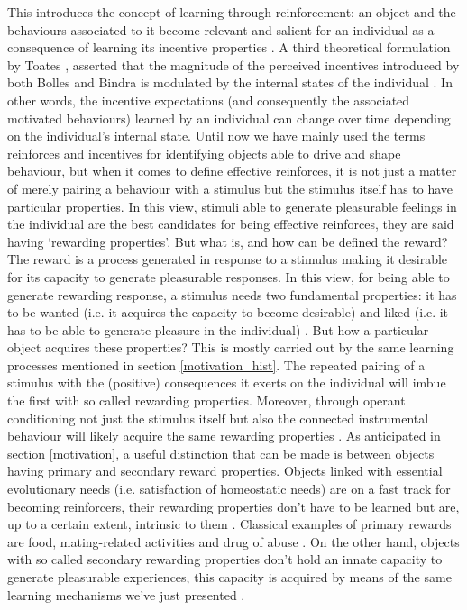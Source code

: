 This introduces the concept of learning through reinforcement: an object and the behaviours associated to it become relevant and salient for an individual as a consequence of learning its incentive properties \cite{berridge2004motivation}. A third theoretical formulation by Toates \cite{toates1994comparing}, asserted that the magnitude of the perceived incentives introduced by both Bolles and Bindra is modulated by the internal states of the individual \cite{toates1994comparing,berridge2004motivation}. In other words, the incentive expectations (and consequently the associated motivated behaviours) learned by an individual can change over time depending on the individual's internal state. Until now we have mainly used the terms reinforces and incentives for identifying objects able to drive and shape behaviour, but when it comes to define effective reinforces, it is not just a matter of merely pairing a behaviour with a stimulus but the stimulus itself has to have particular properties. In this view, stimuli able to generate pleasurable feelings in the individual are the best candidates for being effective reinforces, they are said having ‘rewarding properties’. But what is, and how can be defined the reward? The reward is a process generated in response to a stimulus making it desirable for its capacity to generate pleasurable responses. In this view, for being able to generate rewarding response, a stimulus needs two fundamental properties: it has to be wanted (i.e. it acquires the capacity to become desirable) and liked (i.e. it has to be able to generate pleasure in the individual) \cite{berridge2009dissecting}. But how a particular object acquires these properties? This is mostly carried out by the same learning processes mentioned in section \ref{motivation_hist}. The repeated pairing of a stimulus with the (positive) consequences it exerts on the individual will imbue the first with so called rewarding properties. Moreover, through operant conditioning  not just the stimulus itself but also the connected instrumental behaviour will likely acquire the same rewarding properties \cite{berridge2009dissecting}. As anticipated in section \ref{motivation}, a useful distinction that can be made is between objects having primary and secondary reward properties. Objects linked with essential evolutionary needs (i.e. satisfaction of homeostatic needs) are on a fast track for becoming reinforcers, their rewarding properties don’t have to be learned but are, up to a certain extent, intrinsic to them \cite{sescousse2013processing}. Classical examples of primary rewards are food, mating-related activities and drug of abuse \cite{berridge2004motivation, simpson2016behavioral}. On the other hand, objects with so called secondary rewarding properties don’t hold an innate capacity to generate pleasurable experiences, this capacity is acquired by means of the same learning mechanisms we've just presented \cite{sescousse2013processing}. 


